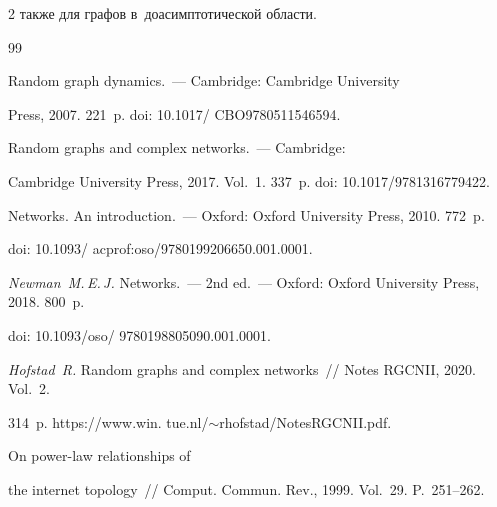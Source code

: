 \begin{multicols}{2}
так\-же для графов в~до\-асимп\-то\-ти\-че\-ской об\-ласти.



{\small\frenchspacing

 {\baselineskip=10.7pt


 \begin{thebibliography}{99}

 


 


 Random graph dynamics.~--- Cambridge: Cambridge University

Press, 2007. 221~p. doi: 10.1017/ CBO9780511546594.




 Random graphs and complex networks.~--- Cambridge:

Cambridge University Press, 2017.  Vol.~1. 337~p. doi: 10.1017/9781316779422.








 Networks. An introduction.~--- Oxford: Oxford University Press, 2010. 772~p.

doi: 10.1093/ acprof:oso/9780199206650.001.0001.




\textit{Newman~M.\,E.\,J.} Networks.~--- 2nd ed.~--- Oxford: Oxford University Press, 2018. 800~p.

doi: 10.1093/oso/ 9780198805090.001.0001.




\textit{Hofstad~R.} Random graphs and complex networks~// Notes RGCNII, 2020.  Vol.~2.

314~p. {\sf https://www.win. tue.nl/$\sim$rhofstad/NotesRGCNII.pdf.}




 On power-law relationships of

the internet topology~// Comput. Commun. Rev., 1999. Vol.~29. P.~251--262.


\end{thebibliography}}}
\end{multicols}
